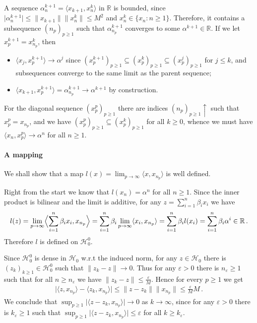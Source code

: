 \documentclass[a4paper]{article}
\newcommand{\Hcal}{\mathcal{H}}
\newcommand{\real}{\mathbb{R}}
\begin{document}
A sequence $\alpha^{k+1}_n = \langle x_{k+1}, x^k_n \rangle$ in $\real$ is bounded,
since $\lvert\alpha^{k+1}_n\rvert \leq \|x_{k+1}\| \|x^k_n\| \leq M^2$ and $x^k_n \in
\{x_n\colon n\geq 1\}$. Therefore, it contains a subsequence $(n_p)_{p\geq1}$ such that
$\alpha^{k+1}_{n_p}$ converges to some $\alpha^{k+1} \in \real$. If we let $x^{k+1}_p
= x^k_{n_p}$, then
\begin{itemize}
  \item $\langle x_j, x^{k+1}_p \rangle \to \alpha^j$ since $(x^{k+1}_p)_{p\geq 1}
  \subseteq (x^k_p)_{p\geq 1} \subseteq (x^j_p)_{p\geq 1}$ for $j\leq k$, and
  subsequences converge to the same limit as the parent sequence;
  \item $\langle x_{k+1}, x^{k+1}_p \rangle = \alpha^{k+1}_{n_p} \to \alpha^{k+1}$
  by construction.
\end{itemize}
For the diagonal sequence $(x^p_p)_{p\geq1}$ there are indices $(n_p)_{p\geq1} \uparrow$
such that $x^p_p = x_{n_p}$, and we have $(x^p_p)_{p\geq1} \subseteq (x^k_p)_{p\geq1}$
for all $k\geq 0$, whence we must have  $\langle x_n, x^p_p \rangle \to \alpha^n$
for all $n\geq 1$.


\paragraph{A mapping} %
\label{par:a_mapping}

We shall show that a map $l(x) = \lim_{p\to \infty} \langle x, x_{n_p} \rangle$ is
well defined.

Right from the start we know that $l(x_n) = \alpha^n$ for all $n\geq 1$. Since the
inner product is bilinear and the limit is additive, for any $z = \sum_{i=1}^n \beta_i x_i$
we have
\begin{equation*}
  l(z)
    = \lim_{p\to \infty} \Bigl \langle \sum_{i=1}^n \beta_i x_i, x_{n_p} \Bigr \rangle
    = \sum_{i=1}^n \beta_i \lim_{p\to \infty} \langle x_i, x_{n_p} \rangle
    = \sum_{i=1}^n \beta_i l(x_i)
    = \sum_{i=1}^n \beta_i \alpha^i
    \in \real
    \,.
\end{equation*}
Therefore $l$ is defined on $\Hcal^0_0$.

Since $\Hcal^0_0$ is dense in $\Hcal_0$ w.r.t the induced norm, for any $z\in \Hcal_0$
there is $(z_k)_{k\geq1} \in \Hcal^0_0$ such that $\|z_k - z\|\to 0$. Thus for any
$\varepsilon > 0$ there is $n_\varepsilon \geq 1$ such that for all $n\geq n_\varepsilon$
we have $\|z_k - z\| \leq \tfrac\varepsilon{M}$. Hence for every $p\geq 1$ we get
\begin{align*}
  \bigl\lvert \langle z, x_{n_p} \rangle -  \langle z_k, x_{n_p} \rangle \bigr\rvert
    \leq \| z - z_k \| \|x_{n_p} \|
    \leq \tfrac\varepsilon{M} M
    \,.
\end{align*}
We conclude that $\sup_{p\geq 1} \lvert \langle z - z_k, x_{n_p} \rangle \rvert \to 0$
as $k\to \infty$, since for any $\varepsilon > 0$ there is $k_\varepsilon \geq 1$ such
that $\sup_{p\geq 1} \lvert \langle z - z_k, x_{n_p} \rangle \rvert \leq \varepsilon$ for
all $k\geq k_\varepsilon$.
\end{document}
